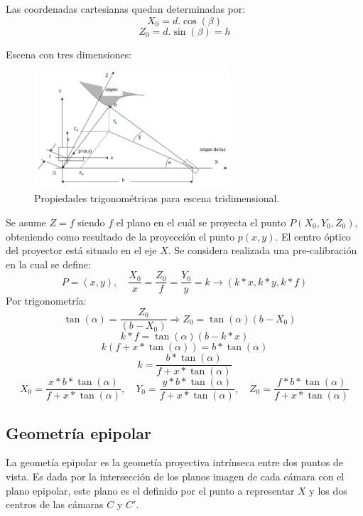 Las coordenadas cartesianas quedan determinadas por:
\[
X_0 = d. \cos (\beta)
\]
\[
Z_0 = d. \sin (\beta) = h
\]

Escena con tres dimensiones:

\begin{figure}[H]
  \centering
    \includegraphics[width=0.65\textwidth]{./Cap6_reconstruccion/triangulacion-2.PNG}
  \caption{Propiedades trigonométricas para escena tridimensional.}
  \label{fig:Triangulacion2}
\end{figure}

Se asume $Z = f$ siendo $f$ el plano en el cuál se proyecta el punto $P(X_0, Y_0, Z_0)$, obteniendo como resultado de la proyección el punto $p(x,y)$.
El centro óptico del proyector está situado en el eje $X$.
Se considera realizada una pre-calibración en la cual se define:
\[
P = (x,y), \quad \frac{X_0}{x} = \frac{Z_0}{f} = \frac{Y_0}{y} = k \to (k * x,k * y,k * f)
\]
Por trigonometría:
\[
\tan (\alpha) = \frac{Z_0}{(b - X_0)} \Rightarrow Z_0 = \tan (\alpha) (b - X_0) \quad 
\]
\[
k * f = \tan (\alpha)(b - k * x)
\]
\[
k (f + x * \tan (\alpha)) = b * \tan (\alpha)
\]
\[
k = \frac	{b * \tan (\alpha)}{f + x * \tan (\alpha)}
\]
\[
X_0 = \frac{x * b * \tan (\alpha)}{f + x * \tan (\alpha)}, \quad Y_0 = \frac{y * b * \tan (\alpha)}{f + x * \tan (\alpha)},\quad Z_0 = \frac{f * b * \tan (\alpha)}{f + x * \tan (\alpha)}
\]

\subsection{Geometría epipolar}
\cite{LibroCompGrafica3} La geometía epipolar es la geometía proyectiva intrínseca entre dos puntos de vista. Es dada por la intersección de los planos imagen de cada cámara con el plano epipolar, este plano es el definido por el punto a representar $X$ y los dos centros de las cámaras $C$ y $C'$.

